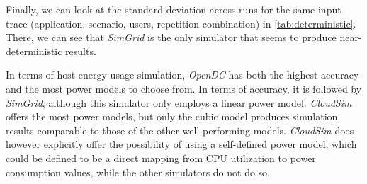 Finally, we can look at the standard deviation across runs for the same input trace (application, scenario, users, repetition combination) in \autoref{tab:deterministic}. There, we can see that \textit{SimGrid} is the only simulator that seems to produce near-deterministic results.


In terms of host energy usage simulation, \textit{OpenDC} has both the highest accuracy and the most power models to choose from. In terms of accuracy, it is followed by \textit{SimGrid}, although this simulator only employs a linear power model. \textit{CloudSim} offers the most power models, but only the cubic model produces simulation results comparable to those of the other well-performing models. \textit{CloudSim} does however explicitly offer the possibility of using a self-defined power model, which could be defined to be a direct mapping from CPU utilization to power consumption values, while the other simulators do not do so. 

